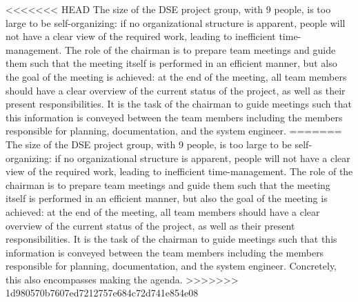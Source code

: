 <<<<<<< HEAD
The size of the DSE project group, with 9 people, is too large to be self-organizing: if no organizational structure is apparent, people will not have a clear view of the required work, leading to inefficient time-management. The role of the chairman is to prepare team meetings and guide them such that the meeting itself is performed in an efficient manner, but also the goal of the meeting is achieved: at the end of the meeting, all team members should have a clear overview of the current status of the project, as well as their present responsibilities. It is the task of the chairman to guide meetings such that this information is conveyed between the team members including the members responsible for planning, documentation, and the system engineer.
=======
The size of the DSE project group, with 9 people, is too large to be self-organizing: if no organizational structure is apparent, people will not have a clear view of the required work, leading to inefficient time-management. The role of the chairman is to prepare team meetings and guide them such that the meeting itself is performed in an efficient manner, but also the goal of the meeting is achieved: at the end of the meeting, all team members should have a clear overview of the current status of the project, as well as their present responsibilities. It is the task of the chairman to guide meetings such that this information is conveyed between the team members including the members responsible for planning, documentation, and the system engineer. Concretely, this also encompasses making the agenda.
>>>>>>> 1d980570b7607ed7212757e684c72d741e854e08
